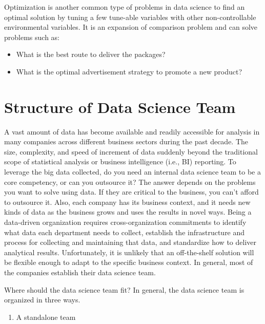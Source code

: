 \documentclass[
  12pt,
]{krantz}
\providecommand{\tightlist}{%
  \setlength{\itemsep}{0pt}\setlength{\parskip}{0pt}}
\begin{document}
Optimization is another common type of problems in data science to find an optimal solution by tuning a few tune-able variables with other non-controllable environmental variables. It is an expansion of comparison problem and can solve problems such as:

\begin{itemize}
\tightlist
\item
  What is the best route to deliver the packages?
\item
  What is the optimal advertisement strategy to promote a new product?
\end{itemize}

\hypertarget{structure-of-data-science-team}{%
\section{Structure of Data Science Team}\label{structure-of-data-science-team}}

A vast amount of data has become available and readily accessible for analysis in many companies across different business sectors during the past decade. The size, complexity, and speed of increment of data suddenly beyond the traditional scope of statistical analysis or business intelligence (i.e., BI) reporting. To leverage the big data collected, do you need an internal data science team to be a core competency, or can you outsource it? The answer depends on the problems you want to solve using data. If they are critical to the business, you can't afford to outsource it. Also, each company has its business context, and it needs new kinds of data as the business grows and uses the results in novel ways. Being a data-driven organization requires cross-organization commitments to identify what data each department needs to collect, establish the infrastructure and process for collecting and maintaining that data, and standardize how to deliver analytical results. Unfortunately, it is unlikely that an off-the-shelf solution will be flexible enough to adapt to the specific business context. In general, most of the companies establish their data science team.

Where should the data science team fit? In general, the data science team is organized in three ways.

\begin{enumerate}
\def\labelenumi{(\arabic{enumi})}
\tightlist
\item
  A standalone team
\end{enumerate}
\end{document}
